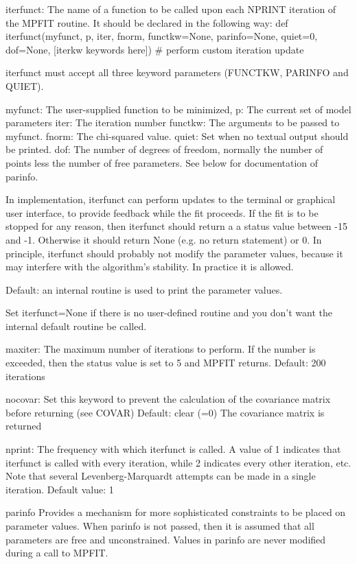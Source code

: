 \begin{DoxyVerb}
     iterfunct:
The name of a function to be called upon each NPRINT iteration of the
MPFIT routine.  It should be declared in the following way:
   def iterfunct(myfunct, p, iter, fnorm, functkw=None,
         parinfo=None, quiet=0, dof=None, [iterkw keywords here])
   # perform custom iteration update

iterfunct must accept all three keyword parameters (FUNCTKW, PARINFO
and QUIET).

myfunct:  The user-supplied function to be minimized,
p:      The current set of model parameters
iter:    The iteration number
functkw:  The arguments to be passed to myfunct.
fnorm:  The chi-squared value.
quiet:  Set when no textual output should be printed.
dof:      The number of degrees of freedom, normally the number of points
  less the number of free parameters.
See below for documentation of parinfo.

In implementation, iterfunct can perform updates to the terminal or
graphical user interface, to provide feedback while the fit proceeds.
If the fit is to be stopped for any reason, then iterfunct should return a
a status value between -15 and -1.  Otherwise it should return None
(e.g. no return statement) or 0.
In principle, iterfunct should probably not modify the parameter values,
because it may interfere with the algorithm's stability.  In practice it
is allowed.

Default: an internal routine is used to print the parameter values.

Set iterfunct=None if there is no user-defined routine and you don't
want the internal default routine be called.

     maxiter:
The maximum number of iterations to perform.  If the number is exceeded,
then the status value is set to 5 and MPFIT returns.
Default: 200 iterations

     nocovar:
Set this keyword to prevent the calculation of the covariance matrix
before returning (see COVAR)
Default: clear (=0)  The covariance matrix is returned

     nprint:
The frequency with which iterfunct is called.  A value of 1 indicates
that iterfunct is called with every iteration, while 2 indicates every
other iteration, etc.  Note that several Levenberg-Marquardt attempts
can be made in a single iteration.
Default value: 1

     parinfo
Provides a mechanism for more sophisticated constraints to be placed on
parameter values.  When parinfo is not passed, then it is assumed that
all parameters are free and unconstrained.  Values in parinfo are never
modified during a call to MPFIT.


\end{DoxyVerb}
